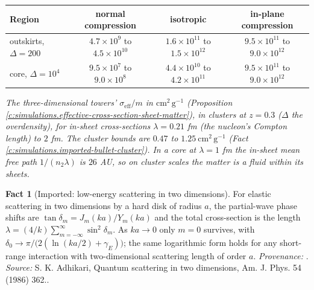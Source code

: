 \documentclass[11pt]{article}
\theoremstyle{definition}
\newtheorem{fact}[theorem]{Fact}
\theoremstyle{plain}
\providecommand{\cmg}{}\renewcommand{\cmg}{\mathrm{cm^{2}\,g^{-1}}}
\begin{document}
\centering \begin{tabular}{@{}lccc@{}}
\toprule
Region & normal compression & isotropic & in-plane compression \\
\midrule
outskirts, $\Delta = 200$ & $4.7\times10^{9}$ to $4.5\times10^{10}$ & $1.6\times10^{11}$ to $1.5\times10^{12}$ & $9.5\times10^{11}$ to $9.0\times10^{12}$ \\
core, $\Delta = 10^{4}$ & $9.5\times10^{7}$ to $9.0\times10^{8}$ & $4.4\times10^{10}$ to $4.2\times10^{11}$ & $9.5\times10^{11}$ to $9.0\times10^{12}$ \\
\bottomrule
\end{tabular}

\emph{The three-dimensional towers' $\sigma_{\mathrm{eff}}/m$ in $\cmg$ (Proposition \ref{c:simulations.effective-cross-section-sheet-matter}), in clusters at $z = 0.3$ ($\Delta$ the overdensity), for in-sheet cross-sections $\lambda = 0.21$ fm (the nucleon's Compton length) to $2$ fm. The cluster bounds are $0.47$ to $1.25\ \cmg$ (Fact \ref{c:simulations.imported-bullet-cluster}). In a core at $\lambda = 1$ fm the in-sheet mean free path $1/(n_{2}\lambda)$ is $26$ AU, so on cluster scales the matter is a fluid within its sheets.}

\begin{fact}[Imported: low-energy scattering in two dimensions]\label{c:simulations.imported-low-energy-scattering-two-dimensions}
For elastic scattering in two dimensions by a hard disk of radius $a$, the partial-wave phase shifts are $\tan\delta_{m} = J_{m}(ka)/Y_{m}(ka)$ and the total cross-section is the length $\lambda = (4/k)\sum_{m=-\infty}^{\infty}\sin^{2}\delta_{m}$. As $ka \to 0$ only $m = 0$ survives, with $\delta_{0} \to \pi/\bigl(2(\ln(ka/2) + \gamma_{E})\bigr)$; the same logarithmic form holds for any short-range interaction with two-dimensional scattering length of order $a$. \emph{Provenance:} \cite{Adhikari1986}.
\emph{Source:} S. K. Adhikari, Quantum scattering in two dimensions, Am. J. Phys. 54 (1986) 362..
\end{fact}
\end{document}
